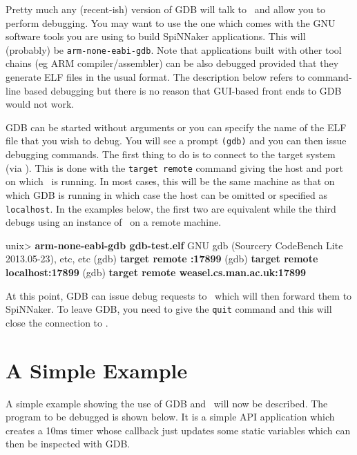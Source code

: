 Pretty much any (recent-ish) version of GDB will talk to \gdbspin\ and
allow you to perform debugging.  You may want to use the one which
comes with the GNU software tools you are using to build SpiNNaker
applications. This will (probably) be \texttt{arm-none-eabi-gdb}.
Note that applications built with other tool chains (eg ARM
compiler/assembler) can be also debugged provided that they generate
ELF files in the usual format. The description below refers to
command-line based debugging but there is no reason that GUI-based
front ends to GDB would not work.

GDB can be started without arguments or you can specify the name of
the ELF file that you wish to debug. You will see a
prompt \texttt{(gdb)} and you can then issue debugging commands. The
first thing to do is to connect to the target system
(via \gdbspin). This is done with the \texttt{target remote} command
giving the host and port on which \gdbspin\ is running.  In most
cases, this will be the same machine as that on which GDB is running
in which case the host can be omitted or specified
as \texttt{localhost}. In the examples below, the first two are
equivalent while the third debugs using an instance of
\gdbspin\ on a remote machine.

\begin{shell}
unix> \textbf{arm-none-eabi-gdb gdb-test.elf}
GNU gdb (Sourcery CodeBench Lite 2013.05-23), etc, etc
(gdb) \textbf{target remote :17899}
(gdb) \textbf{target remote localhost:17899}
(gdb) \textbf{target remote weasel.cs.man.ac.uk:17899}
\end{shell}

At this point, GDB can issue debug requests to \gdbspin\ which will
then forward them to SpiNNaker. To leave GDB, you need to give
the \texttt{quit} command and this will close the connection to
\gdbspin.

\section{A Simple Example}

A simple example showing the use of GDB and \gdbspin\ will now be
described. The program to be debugged is shown below. It is a simple
API application which creates a 10ms timer whose callback just updates
some static variables which can then be inspected with GDB.

